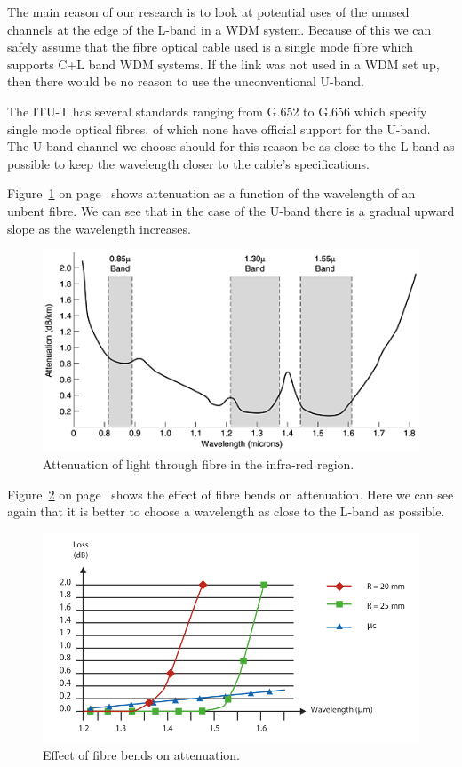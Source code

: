 \documentclass{article}
\begin{document}
The main reason of our research is to look at potential uses of the unused channels at the edge of the L-band in a WDM system.
Because of this we can safely assume that the fibre optical cable used is a single mode fibre which supports C+L band WDM systems.
If the link was not used in a WDM set up, then there would be no reason to use the unconventional U-band.

The ITU-T has several standards ranging from G.652 to G.656 which specify single mode optical fibres\cite[chap. 6-7]{itu-t:manual2009}, of which none have official support for the U-band.
The U-band channel we choose should for this reason be as close to the L-band as possible to keep the wavelength closer to the cable's specifications.

Figure~\ref{fig:attenuation} on page~\pageref{fig:attenuation} shows attenuation as a function of the wavelength of an unbent fibre. We can see that in the case of the U-band there is a gradual upward slope as the wavelength increases.
\begin{figure}[h]
\centerline{\includegraphics[scale=0.5, trim = 0mm 0mm 0mm 0mm]{images/attenuation.png}}
\caption{Attenuation of light through fibre in the infra-red region.\cite[fig 2-6]{tannenbaum:networks}}
\label{fig:attenuation}
\end{figure}

Figure~\ref{fig:attenuation-bends} on page~\pageref{fig:attenuation-bends} shows the effect of fibre bends on attenuation. Here we can see again that it is better to choose a wavelength as close to the L-band as possible.
\begin{figure}[h]
\centerline{\includegraphics[scale=0.3, trim = 0mm 0mm 0mm 0mm]{images/attenuation-bends.png}}
\caption{Effect of fibre bends on attenuation.\cite[p. 27]{refguide:2011}}
\label{fig:attenuation-bends}
\end{figure}
\end{document}
